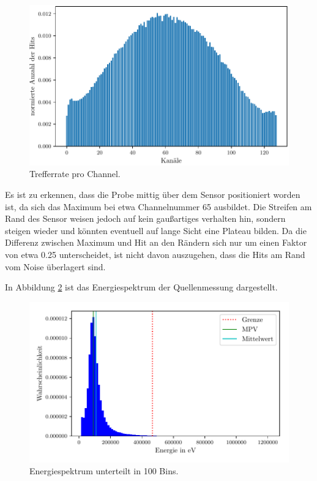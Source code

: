 \begin{figure}[H]
  \centering
  \includegraphics{build/Quellenmessung_Hitmap.pdf}
  \caption{Trefferrate pro Channel.}
  \label{fig:CEE_fit}
\end{figure}

Es ist zu erkennen, dass die Probe mittig über dem Sensor positioniert worden ist, da sich das Maximum bei etwa Channelnummer 65 ausbildet. Die Streifen am Rand des Sensor weisen jedoch auf kein gaußartiges verhalten hin, sondern steigen wieder und könnten eventuell auf lange Sicht eine Plateau bilden. Da die Differenz zwischen Maximum und Hit an den Rändern sich nur um einen Faktor von etwa 0.25 unterscheidet, ist nicht davon auszugehen, dass die Hits am Rand vom Noise überlagert sind.

In Abbildung \ref{fig:energy} ist das Energiespektrum der Quellenmessung dargestellt. 

\begin{figure}[H]
  \centering
  \includegraphics{build/big_clusterenergie_charge.pdf}
  \caption{Energiespektrum unterteilt in 100 Bins.}
  \label{fig:energy}
\end{figure}

